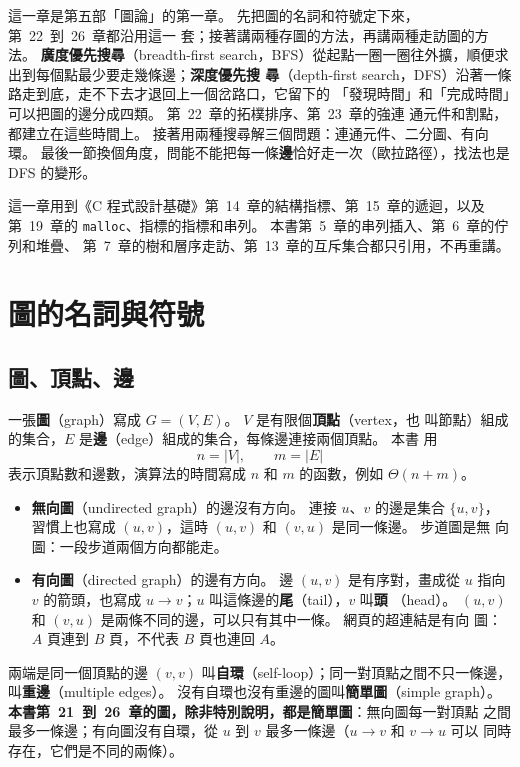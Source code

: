 這一章是第五部「圖論」的第一章。 先把圖的名詞和符號定下來，第~22~到~26~章都沿用這一
套；接著講兩種存圖的方法，再講兩種走訪圖的方法。 \textbf{廣度優先搜尋}（breadth-first
search，BFS）從起點一圈一圈往外擴，順便求出到每個點最少要走幾條邊；\textbf{深度優先搜
尋}（depth-first search，DFS）沿著一條路走到底，走不下去才退回上一個岔路口，它留下的
「發現時間」和「完成時間」可以把圖的邊分成四類。 第~22~章的拓樸排序、第~23~章的強連
通元件和割點，都建立在這些時間上。 接著用兩種搜尋解三個問題：連通元件、二分圖、有向
環。 最後一節換個角度，問能不能把每一條\textbf{邊}恰好走一次（歐拉路徑），找法也是 DFS 的變形。

這一章用到《C 程式設計基礎》第~14~章的結構指標、第~15~章的遞迴，以及第~19~章的
\texttt{malloc}、指標的指標和串列。 本書第~5~章的串列插入、第~6~章的佇列和堆疊、
第~7~章的樹和層序走訪、第~13~章的互斥集合都只引用，不再重講。

\section{圖的名詞與符號}
\label{sec:gtr-terms}

\subsection{圖、頂點、邊}

一張\textbf{圖}（graph）寫成 $G = (V, E)$。 $V$ 是有限個\textbf{頂點}（vertex，也
叫節點）組成的集合，$E$ 是\textbf{邊}（edge）組成的集合，每條邊連接兩個頂點。 本書
用
\[
n = |V|, \qquad m = |E|
\]
表示頂點數和邊數，演算法的時間寫成 $n$ 和 $m$ 的函數，例如 $\Theta(n + m)$。

\begin{itemize}
\item \textbf{無向圖}（undirected graph）的邊沒有方向。 連接 $u$、$v$ 的邊是集合
$\{u, v\}$，習慣上也寫成 $(u, v)$，這時 $(u, v)$ 和 $(v, u)$ 是同一條邊。 步道圖是無
向圖：一段步道兩個方向都能走。
\item \textbf{有向圖}（directed graph）的邊有方向。 邊 $(u, v)$ 是有序對，畫成從 $u$
指向 $v$ 的箭頭，也寫成 $u \to v$；$u$ 叫這條邊的\textbf{尾}（tail），$v$ 叫\textbf{頭}
（head）。 $(u, v)$ 和 $(v, u)$ 是兩條不同的邊，可以只有其中一條。 網頁的超連結是有向
圖：$A$ 頁連到 $B$ 頁，不代表 $B$ 頁也連回 $A$。
\end{itemize}

兩端是同一個頂點的邊 $(v, v)$ 叫\textbf{自環}（self-loop）；同一對頂點之間不只一條邊，
叫\textbf{重邊}（multiple edges）。 沒有自環也沒有重邊的圖叫\textbf{簡單圖}（simple
graph）。 \textbf{本書第~21~到~26~章的圖，除非特別說明，都是簡單圖}：無向圖每一對頂點
之間最多一條邊；有向圖沒有自環，從 $u$ 到 $v$ 最多一條邊（$u \to v$ 和 $v \to u$ 可以
同時存在，它們是不同的兩條）。

